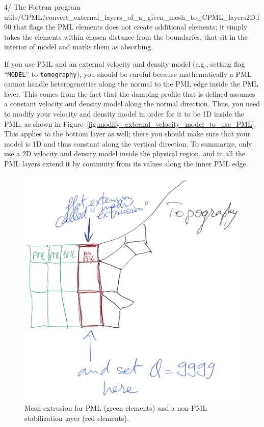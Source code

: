 4/ The Fortran program utils/CPML/convert\_external\_layers\_of\_a\_given\_mesh\_to\_CPML\_layers2D.f90
that flags the PML elements does not create additional elements; it simply takes the elements within chosen distance from the boundaries, that sit in the interior of model and marks them as absorbing.

If you use PML and an external velocity and density model (e.g., setting flag ``\texttt{MODEL}'' to \texttt{tomography}),
you should be careful because mathematically a PML cannot handle heterogeneities along the
normal to the PML edge inside the PML layer. This comes from the fact that the damping profile
that is defined assumes a constant velocity and density model along the normal
direction.
Thus, you need to modify your velocity and density model in order for it to be 1D inside
the PML, as shown in Figure~\ref{fig:modify_external_velocity_model_to_use_PML}.
This applies to the bottom layer as well; there you should make sure
that your model is 1D and thus constant along the vertical direction.
To summarize, only use a 2D velocity and density model inside the physical region, and in
all the PML layers extend it by continuity from its values along the
inner PML edge.

\begin{figure}[htbp]
\noindent \begin{centering}
\includegraphics[width=4.5in]{figures/how_to_use_a_transition_mesh_layer_to_stabilize_PML.png}
\par\end{centering}
\caption{Mesh extrusion for PML (green elements) and a non-PML stabilization layer (red elements).}
\label{fig:mesh_extrusion}
\end{figure}

